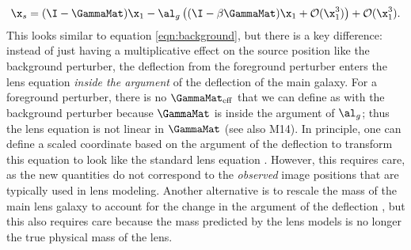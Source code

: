 \begin{equation}
\x_s = (\I - \GammaMat) \x_1 - \al_g\left((\I - \beta\GammaMat) \x_1 + \mathcal{O}(\x_1^3)\right) + \mathcal{O}(\x_1^3).
\end{equation}
This looks similar to equation \ref{eqn:background}, but there is a key difference: instead of just having a multiplicative effect on the source position like the background perturber, the deflection from the foreground perturber enters the lens equation \textit{inside the argument} of the deflection of the main galaxy. For a foreground perturber, there is no $\GammaMat_{\rm eff}$ that we can define as with the background perturber because $\GammaMat$ is inside the argument of $\al_g$; thus the lens equation is not linear in $\GammaMat$ (see also M14). In principle, one can define a scaled coordinate based on the argument of the deflection to transform this equation to look like the standard lens equation \citep[e.g.,][]{Schneider97,Keeton03}. However, this requires care, as the new quantities do not correspond to the \textit{observed} image positions that are typically used in lens modeling. Another alternative is to rescale the mass of the main lens galaxy to account for the change in the argument of the deflection \citep{Schneider97}, but this also requires care because the mass predicted by the lens models is no longer the true physical mass of the lens.
  
  
  